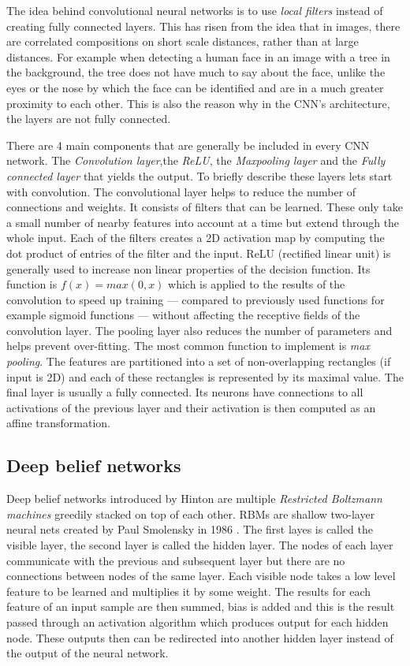 The idea behind convolutional neural networks is to use \textit{local filters} instead of creating fully connected layers. This has risen from the idea that in images, there are correlated compositions on short scale distances, rather than at large distances. For example when detecting a human face in an image with a tree in the background, the tree does not have much to say about the face, unlike the eyes or the nose by which the face can be identified and are in a much greater proximity to each other. This is also the reason why in the CNN's architecture, the layers are not fully connected. 

There are 4 main components that are generally be included in every CNN network. The \textit{Convolution layer},the \textit{ReLU}, the \textit{Maxpooling layer} and the \textit{Fully connected layer} that yields the output. To briefly describe these layers lets start with convolution. The convolutional layer helps to reduce the number of connections and weights. It consists of filters that can be learned. These only take a small number of nearby features into account at a time but extend through the whole input. Each of the filters creates a 2D activation map by computing the dot product of entries of the filter and the input. ReLU (rectified linear unit) is generally used to increase non linear properties of the decision function. Its function is $ f(x) = max(0,x) $ which is applied to the results of the convolution to speed up training --- compared to previously used functions for example sigmoid functions --- without affecting the receptive fields of the convolution layer. The pooling layer also reduces the number of parameters and helps prevent over-fitting. The most common function to implement is \textit{max pooling}. The features are partitioned into a set of non-overlapping rectangles (if input is 2D) and each of these rectangles  is represented by its maximal value. 
The final layer is usually a fully connected. Its neurons have connections to all activations of the previous layer and their activation is then computed as an affine transformation. 

\subsection{Deep belief networks}
Deep belief networks introduced by Hinton \cite{Hinton504} are multiple \textit{Restricted Boltzmann machines} greedily stacked on top of each other. RBMs are shallow two-layer neural nets created by Paul Smolensky in 1986 \cite{Smolensky1986InformationPI}. The first layes is called the visible layer, the second layer is called the hidden layer. The nodes of each layer communicate with the previous and subsequent layer but there are no connections between nodes of the same layer. Each visible node takes a low level feature to be learned and multiplies it by some weight. The results for each feature of an input sample are then summed, bias is added and this is the result passed through an activation algorithm which produces output for each hidden node. These outputs then can be redirected into another hidden layer instead of the output of the neural network. 

